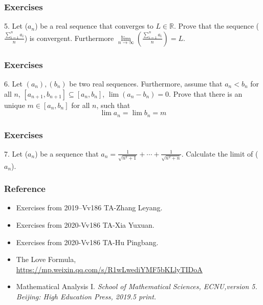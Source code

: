 \documentclass{beamer}
\newcommand{\myfont}{\rmfamily\normalsize\upshape\mdseries}
\begin{document}
\begin{frame}
    \frametitle{Exercises}
    5. Let ($a_n$) be a real sequence that converges to $L \in \mathbb{R}$.
    Prove that the sequence ($\frac{\sum_{i=1}^n a_i}{n}$) is convergent. 
    Furthermore $\underset{n\rightarrow \infty}{\lim} (\frac{\sum_{i=1}^n a_i}{n})=L $.
\end{frame}

\begin{frame}
    \frametitle{Exercises}
6. Let $(a_n),(b_n)$ be two real sequences. Furthermore, assume that $a_n<b_n$
for all $n$, $[a_{n+1}, b_{n+1}]\subseteq [a_n,b_n]$, $\lim (a_n-b_n)=0$. Prove that there 
is an unique $m\in [a_n,b_n]$ for all $n$, such that 
\begin{equation*}
    \lim a_n=\lim b_n=m
\end{equation*}
\end{frame}
\begin{frame}
    \frametitle{Exercises}
    7. Let ($a_n$) be a sequence that $a_n=\frac{1}{\sqrt{n^2+1}}+\cdots+\frac{1}{\sqrt{n^2+n}}$.
    Calculate the limit of ($a_n$).    

\end{frame}
\begin{frame}
    \frametitle{Reference}
    \begin{itemize}
        \item Exercises from 2019–Vv186 TA-Zhang Leyang.
        \item Exercises from 2020-Vv186 TA-Xia Yuxuan.
        \item Exercises from 2020-Vv186 TA-Hu Pingbang.
        \item The Love Formula, \url{https://mp.weixin.qq.com/s/R1wLwediYMF5bKLlyTIDoA}
        \item Mathematical Analysis I. \itshape School of Mathematical Sciences, ECNU,\myfont version 5. 
        Beijing: High Education Press, 2019.5 print.
    \end{itemize}

\end{frame}
\end{document}
